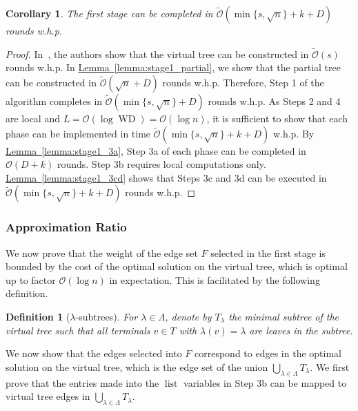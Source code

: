 \documentclass[letterpaper,11pt]{article}
\newtheorem{definition}[theorem]{Definition}
\newtheorem{corollary}[theorem]{Corollary}
\newcommand{\namedref}[2]{\hyperref[#2]{#1~\ref*{#2}}}
\newcommand{\lemmaref}[1]{\namedref{Lemma}{#1}}
\newcommand{\BO}{\mathcal{O}}
\newcommand{\sO}{\tilde{\mathcal{O}}}
\newcommand{\Comp}{\lambda}
\DeclareMathOperator{\WD}{WD}
\DeclareMathOperator{\unsent}{list}
\begin{document}
\begin{corollary}\label{coro:stage1_time}
The first stage can be completed in $\tilde{\BO}(\min\{s,\sqrt{n}\}+k+D)$
rounds w.h.p.
\end{corollary}
\begin{proof}
In~\cite{KKMPT-12}, the authors show that the virtual tree can be constructed in
$\tilde{\BO}(s)$ rounds w.h.p. In \lemmaref{lemma:stage1_partial}, we show that
the partial tree can be constructed in $\tilde{\BO}(\sqrt{n}+D)$ rounds w.h.p.
Therefore, Step 1 of the algorithm completes in
$\tilde{\BO}(\min\{s,\sqrt{n}\}+D)$ rounds w.h.p. As Steps 2 and 4 are local
and $L=\BO(\log \WD)=\BO(\log n)$, it is sufficient to show that each phase
can be implemented in time $\sO(\min\{s,\sqrt{n}\}+k+D)$ w.h.p. By
\lemmaref{lemma:stage1_3a}, Step 3a of each phase can be completed in $\BO(D+k)$
rounds. Step 3b requires local computations only. \lemmaref{lemma:stage1_3cd}
shows that Steps 3c and 3d can be executed in $\sO(\min\{s,\sqrt{n}\}+k+D)$
rounds w.h.p.
\end{proof}

\subsubsection*{Approximation Ratio}

We now prove that the weight of the edge set $F$ selected in the first stage is
bounded by the cost of the optimal solution on the virtual tree, which is
optimal up to factor $\BO(\log n)$ in expectation. This is facilitated by the
following definition.

\begin{definition}[$\Comp$-subtrees]
For $\Comp \in \Lambda$, denote by $T_{\Comp}$ the minimal subtree of the
virtual tree such that all terminals $v\in T$ with $\Comp(v)=\Comp$ are leaves
in the subtree.
\end{definition}

We now show that the edges selected into $F$ correspond to edges in the optimal
solution on the virtual tree, which is the edge set of the
union $\bigcup_{\Comp\in \Lambda}T_{\Comp}$. We first prove that the entries
made into the $\unsent$ variables in Step 3b can be mapped to virtual tree edges
in $\bigcup_{\Comp\in \Lambda}T_{\Comp}$.
\end{document}
